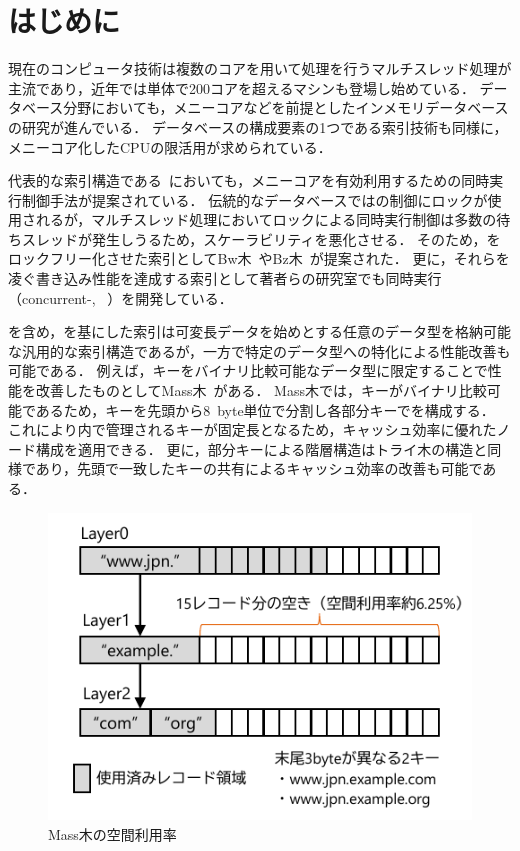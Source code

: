 
\section{はじめに}
現在のコンピュータ技術は複数のコアを用いて処理を行うマルチスレッド処理が主流であり，近年では単体で200コアを超えるマシンも登場し始めている．
データベース分野においても，メニーコアなどを前提としたインメモリデータベースの研究が進んでいる．
データベースの構成要素の1つである索引技術も同様に，メニーコア化したCPUの限活用が求められている．

代表的な索引構造である\Bptree{}~\cite{book:dbsystem}においても，メニーコアを有効利用するための同時実行制御手法が提案されている．
伝統的なデータベースでは\Bptree{}の制御にロックが使用されるが，マルチスレッド処理においてロックによる同時実行制御は多数の待ちスレッドが発生しうるため，スケーラビリティを悪化させる．
そのため，\Bptree{}をロックフリー化させた索引としてBw木~\cite{book:Bwtree}やBz木~\cite{book:Bztree}が提案された．
更に，それらを凌ぐ書き込み性能を達成する索引として著者らの研究室でも同時実行\Bptree{}（concurrent-\Bptree{}, \Bctree{}~\cite{deim:Hirano2024}）を開発している．

\Bctree{}を含め，\Bptree{}を基にした索引は可変長データを始めとする任意のデータ型を格納可能な汎用的な索引構造であるが，一方で特定のデータ型への特化による性能改善も可能である．
例えば，キーをバイナリ比較可能なデータ型に限定することで性能を改善したものとしてMass木~\cite{book:Masstree}がある．
Mass木では，キーがバイナリ比較可能であるため，キーを先頭から8~byte単位で分割し各部分キーで\Bptree{}を構成する．
これにより\Bptree{}内で管理されるキーが固定長となるため，キャッシュ効率に優れたノード構成を適用できる．
更に，部分キーによる階層構造はトライ木の構造と同様であり，先頭で一致したキーの共有によるキャッシュ効率の改善も可能である．

\begin{figure}[t]
    \centering
    \includegraphics{./figures/mass_memory.pdf}
    \caption{Mass木の空間利用率}
    \label{fig:memory}
\end{figure}

